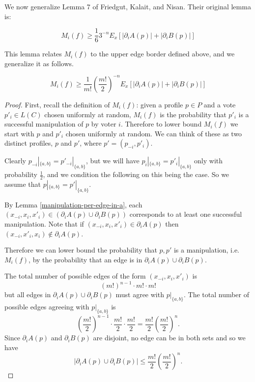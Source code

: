 	We now generalize Lemma 7 of Friedgut, Kalait, and Nisan. Their original lemma is:

	\begin{lemma}
		\[
			M_i(f) \ge \frac{1}{6} 3^{-n} E_x \left[|\partial_i A(p)| + |\partial_i B(p)| \right]
		\]
	\end{lemma}

	This lemma relates $M_i(f)$ to the upper edge border defined above, and we generalize it as follows.

	\begin{lemma}
		\label{friedgut-lemma-7}
		\[
			M_i(f) \ge \frac{1}{m!} \left(\frac{m!}{2}\right)^{-n} E_x \left[|\partial_i A(p)| + |\partial_i B(p)| \right]
		\]
	\end{lemma}

	\begin{proof}
		First, recall the definition of $M_i(f)$: given a profile $p \in P$ and a vote $p'_i \in L(C)$ chosen uniformly at random, $M_i(f)$ is the probability that $p'_i$ is a successful manipulation of $p$ by voter $i$. Therefore to lower bound $M_i(f)$ we start with $p$ and $p'_i$ chosen uniformly at random. We can think of these as two distinct profiles, $p$ and $p'$, where $p' = (p_{-i}, p'_i)$.

		Clearly $p_{-i}|_{\{a,b\}} = p'_{-i}|_{\{a,b\}}$, but we will have $p_i|_{\{a,b\}} = p'_i|_{\{a,b\}}$ only with probability $\frac{1}{2}$, and we condition the following on this being the case. So we assume that $p|_{\{a,b\}} = p'|_{\{a,b\}}$.

		By Lemma \ref{manipulation-per-edge-in-a}, each $(x_{-i}, x_i, x'_i) \in (\partial_i A(p) \cup \partial_i B(p))$ corresponds to at least one successful manipulation. Note that if $(x_{-i}, x_i, x'_i) \in \partial_i A(p)$ then $(x_{-i}, x'_i, x_i) \notin \partial_i A(p)$.

		Therefore we can lower bound the probability that $p, p'$ is a manipulation, i.e. $M_i(f)$, by the probability that an edge is in $\partial_i A(p) \cup \partial_i B(p)$.

		The total number of possible edges of the form $(x_{-i}, x_i, x'_i)$ is
		\[
			(m!)^{n-1} \cdot m! \cdot m!
		\]
		but all edges in $\partial_i A(p) \cup \partial_i B(p)$ must agree with $p|_{\{a, b\}}$. The total number of possible edges agreeing with $p|_{\{a, b\}}$ is
		\[
			\left(\frac{m!}{2}\right)^{n-1} \cdot \frac{m!}{2} \cdot \frac{m!}{2} = \frac{m!}{2}\left(\frac{m!}{2}\right)^{n}.
		\]
		Since $\partial_i A(p)$ and $\partial_i B(p)$ are disjoint, no edge can be in both sets and so we have
		\[
			|\partial_i A(p) \cup \partial_i B(p)| \le \frac{m!}{2}\left(\frac{m!}{2}\right)^{n}.
		\]


\end{proof}
